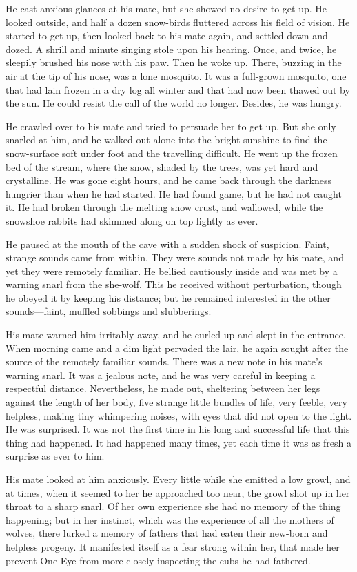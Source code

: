 \documentclass[10pt]{book}
\begin{document}
He cast anxious glances at his mate, but she showed no desire to get
up. He looked outside, and half a dozen snow-birds fluttered across his
field of vision. He started to get up, then looked back to his mate
again, and settled down and dozed. A shrill and minute singing stole
upon his hearing. Once, and twice, he sleepily brushed his nose with
his paw. Then he woke up. There, buzzing in the air at the tip of his
nose, was a lone mosquito. It was a full-grown mosquito, one that had
lain frozen in a dry log all winter and that had now been thawed out by
the sun. He could resist the call of the world no longer. Besides, he
was hungry.

He crawled over to his mate and tried to persuade her to get up. But
she only snarled at him, and he walked out alone into the bright
sunshine to find the snow-surface soft under foot and the travelling
difficult. He went up the frozen bed of the stream, where the snow,
shaded by the trees, was yet hard and crystalline. He was gone eight
hours, and he came back through the darkness hungrier than when he had
started. He had found game, but he had not caught it. He had broken
through the melting snow crust, and wallowed, while the snowshoe
rabbits had skimmed along on top lightly as ever.

He paused at the mouth of the cave with a sudden shock of suspicion.
Faint, strange sounds came from within. They were sounds not made by
his mate, and yet they were remotely familiar. He bellied cautiously
inside and was met by a warning snarl from the she-wolf. This he
received without perturbation, though he obeyed it by keeping his
distance; but he remained interested in the other sounds—faint, muffled
sobbings and slubberings.

His mate warned him irritably away, and he curled up and slept in the
entrance. When morning came and a dim light pervaded the lair, he again
sought after the source of the remotely familiar sounds. There was a
new note in his mate’s warning snarl. It was a jealous note, and he was
very careful in keeping a respectful distance. Nevertheless, he made
out, sheltering between her legs against the length of her body, five
strange little bundles of life, very feeble, very helpless, making tiny
whimpering noises, with eyes that did not open to the light. He was
surprised. It was not the first time in his long and successful life
that this thing had happened. It had happened many times, yet each time
it was as fresh a surprise as ever to him.

His mate looked at him anxiously. Every little while she emitted a low
growl, and at times, when it seemed to her he approached too near, the
growl shot up in her throat to a sharp snarl. Of her own experience she
had no memory of the thing happening; but in her instinct, which was
the experience of all the mothers of wolves, there lurked a memory of
fathers that had eaten their new-born and helpless progeny. It
manifested itself as a fear strong within her, that made her prevent
One Eye from more closely inspecting the cubs he had fathered.
\end{document}
